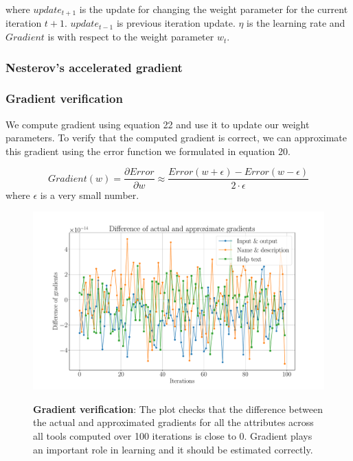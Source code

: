 where $update_{t+1}$ is the update for changing the weight parameter for the current iteration $t+1$. $update_{t-1}$ is previous iteration update. $\eta$ is the learning rate and $Gradient$ is with respect to the weight parameter $w_t$. 

\subsubsection{Nesterov’s accelerated gradient}


\subsubsection{Gradient verification}
We compute gradient using equation 22 and use it to update our weight parameters. To verify that the computed gradient is correct, we can approximate this gradient using the error function we formulated in equation 20.

\begin{equation}
Gradient(w) = \frac{\partial Error}{\partial w} \approx \frac{Error(w + \epsilon) - Error(w - \epsilon)}{2 \cdot \epsilon} 
\end{equation}
where $\epsilon$ is a very small number. 

\begin{figure}[h]
\begin{centering}
    {\includegraphics[scale=0.35]{figures/Difference_gradients.pdf}}
    \caption[Gradient verification]{\textbf{Gradient verification}: The plot checks that the difference between the actual and approximated gradients for all the attributes across all tools computed over 100 iterations is close to 0. Gradient plays an important role in learning and it should be estimated correctly. }
\end{centering}
\end{figure}
